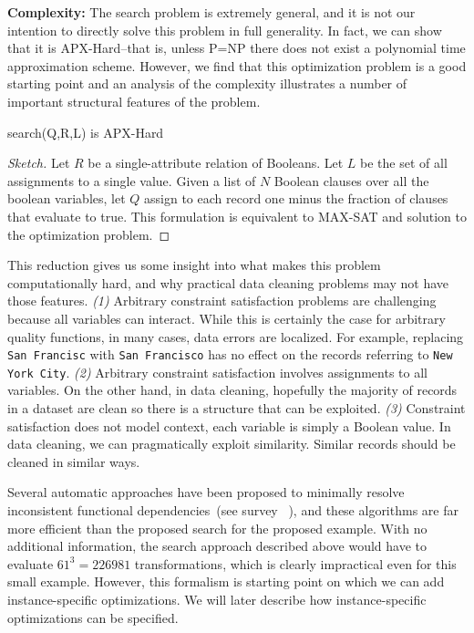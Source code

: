 \vspace{0.25em} \noindent\textbf{Complexity: } The search problem is extremely general, and it is not our intention to directly solve this problem in full generality.
In fact, we can show that it is APX-Hard--that is, unless P=NP there does not exist a polynomial time approximation scheme.
However, we find that this optimization problem is a good starting point and an analysis of the complexity illustrates a number of important structural features of the problem.

\begin{proposition}
\textsf{search(Q,R,L)} is \textsf{APX-Hard}
\end{proposition}
\begin{proof}[Sketch]
Let $R$ be a single-attribute relation of Booleans. Let $L$ be the set of all assignments to a single value.
Given a list of $N$ Boolean clauses over all the boolean variables, let $Q$ assign to each record one minus the fraction of clauses that evaluate to true. This formulation is equivalent to MAX-SAT and solution to the optimization problem.
\end{proof}

This reduction gives us some insight into what makes this problem computationally hard, and why practical data cleaning problems may not have those features. \emph{(1)} Arbitrary constraint satisfaction problems are challenging because all variables can interact. While this is certainly the case for arbitrary quality functions, in many cases, data errors are localized. For example, replacing \texttt{San Francisc} with \texttt{San Francisco} has no effect on the records referring to \texttt{New York City}.  \emph{(2)} Arbitrary constraint satisfaction involves assignments to all variables. On the other hand, in data cleaning, hopefully the majority of records in a dataset are clean so there is a structure that can be exploited.
 \emph{(3)} Constraint satisfaction does not model context, each variable is simply a Boolean value. In data cleaning, we can pragmatically exploit similarity. Similar records should be cleaned in similar ways.  

Several automatic approaches have been proposed to minimally resolve inconsistent functional dependencies~(see survey ~\cite{DBLP:conf/sigmod/ChuIKW16}), and these algorithms are far more efficient than the proposed search for the proposed example.
With no additional information, the search approach described above would have to evaluate $61^3 = 226981$ transformations, which is clearly impractical even for this small example.
However, this formalism is starting point on which we can add instance-specific optimizations.
We will later describe how instance-specific optimizations can be specified.

